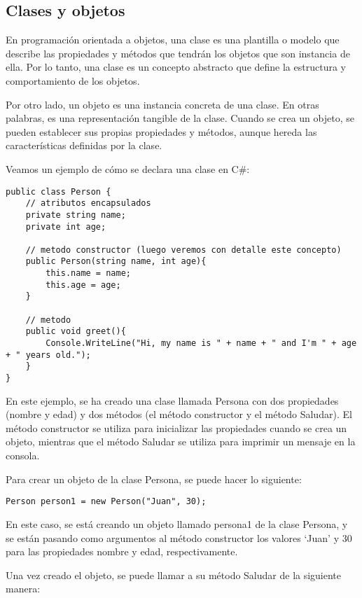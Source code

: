 \documentclass[executivepaper]{article}
\begin{document}
\subsection{Clases y objetos}

En programación orientada a objetos, una clase es una plantilla o modelo que describe las propiedades y métodos que tendrán los objetos que son instancia de ella. Por lo tanto, una clase es un concepto abstracto que define la estructura y comportamiento de los objetos.

Por otro lado, un objeto es una instancia concreta de una clase. En otras palabras, es una representación tangible de la clase. Cuando se crea un objeto, se pueden establecer sus propias propiedades y métodos, aunque hereda las características definidas por la clase.

Veamos un ejemplo de cómo se declara una clase en C\#:
\begin{lstlisting}[language={[Sharp]C}]
public class Person {
    // atributos encapsulados
    private string name;
    private int age;

    // metodo constructor (luego veremos con detalle este concepto)
    public Person(string name, int age){
        this.name = name;
        this.age = age;
    }

    // metodo
    public void greet(){
        Console.WriteLine("Hi, my name is " + name + " and I'm " + age + " years old.");
    }
}
\end{lstlisting}
En este ejemplo, se ha creado una clase llamada Persona con dos propiedades (nombre y edad) y dos métodos (el método constructor y el método Saludar). El método constructor se utiliza para inicializar las propiedades cuando se crea un objeto, mientras que el método Saludar se utiliza para imprimir un mensaje en la consola.

Para crear un objeto de la clase Persona, se puede hacer lo siguiente:

\begin{lstlisting}[language={[Sharp]C}]
Person person1 = new Person("Juan", 30);
\end{lstlisting}

En este caso, se está creando un objeto llamado persona1 de la clase Persona, y se están pasando como argumentos al método constructor los valores \enquote*{Juan} y 30 para las propiedades nombre y edad, respectivamente.

Una vez creado el objeto, se puede llamar a su método Saludar de la siguiente manera:
\end{document}
